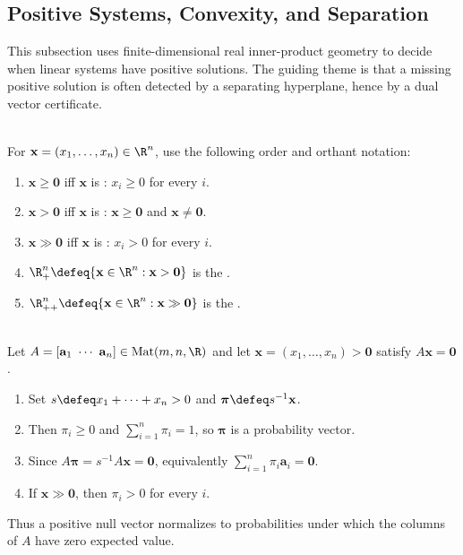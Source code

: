 \subsection{Positive Systems, Convexity, and Separation}


%

This subsection uses finite-dimensional real inner-product geometry to decide when linear systems have positive solutions. The guiding theme is that a missing positive solution is often detected by a separating hyperplane, hence by a dual vector certificate.

\begin{definition} \label{def:positive-vector-orders-orthants} \\
For $\mathbf{x}=(x_1,\ldots,x_n)\in\R^n$, use the following order and orthant notation:
\begin{enumerate}[label=(\roman*)]
\setlength{\itemsep}{0pt}
\item $\mathbf{x}\geq\mathbf{0}$ iff $\mathbf{x}$ is : $x_i\geq0$ for every $i$.
\item $\mathbf{x}>\mathbf{0}$ iff $\mathbf{x}$ is : $\mathbf{x}\geq\mathbf{0}$ and $\mathbf{x}\neq\mathbf{0}$.
\item $\mathbf{x}\gg\mathbf{0}$ iff $\mathbf{x}$ is : $x_i>0$ for every $i$.
\item $\R_+^n\defeq\{\mathbf{x}\in\R^n:\mathbf{x}>\mathbf{0}\}$ is the .
\item $\R_{++}^n\defeq\{\mathbf{x}\in\R^n:\mathbf{x}\gg\mathbf{0}\}$ is the .
\end{enumerate}
\end{definition}

\begin{motivation} \label{mot:positive-solutions-probability-distributions} \\
Let $A=[\mathbf{a}_1\ \cdots\ \mathbf{a}_n]\in\operatorname{Mat}(m,n,\R)$ and let $\mathbf{x}=(x_1,\ldots,x_n)>\mathbf{0}$ satisfy $A\mathbf{x}=\mathbf{0}$.
\begin{enumerate}[label=(\roman*)]
\setlength{\itemsep}{0pt}
\item Set $s\defeq x_1+\cdots+x_n>0$ and $\boldsymbol{\pi}\defeq s^{-1}\mathbf{x}$.
\item Then $\pi_i\geq0$ and $\sum_{i=1}^n\pi_i=1$, so $\boldsymbol{\pi}$ is a probability vector.
\item Since $A\boldsymbol{\pi}=s^{-1}A\mathbf{x}=\mathbf{0}$, equivalently $\sum\limits_{i=1}^n\pi_i\mathbf{a}_i=\mathbf{0}$.
\item If $\mathbf{x}\gg\mathbf{0}$, then $\pi_i>0$ for every $i$.
\end{enumerate}
Thus a positive null vector normalizes to probabilities under which the columns of $A$ have zero expected value.
\end{motivation}

